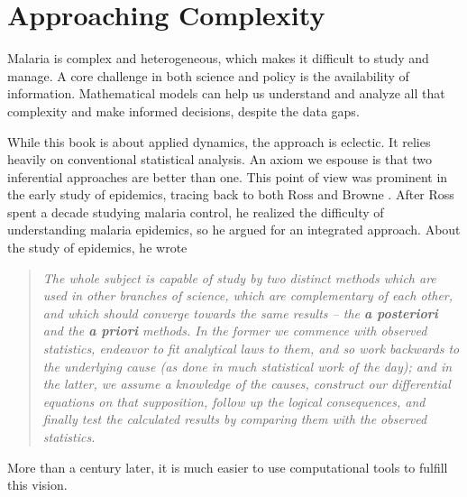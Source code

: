 \documentclass[
]{book}
\begin{document}
\section{Approaching Complexity}\label{approaching-complexity}

Malaria is complex and heterogeneous, which makes it difficult to study and manage. A core challenge in both science and policy is the availability of information. Mathematical models can help us understand and analyze all that complexity and make informed decisions, despite the data gaps.

While this book is about applied dynamics, the approach is eclectic. It relies heavily on conventional statistical analysis. An axiom we espouse is that two inferential approaches are better than one. This point of view was prominent in the early study of epidemics, tracing back to both Ross and Browne \autocite{FinePEM1975RossPriori}. After Ross spent a decade studying malaria control, he realized the difficulty of understanding malaria epidemics, so he argued for an integrated approach. About the study of epidemics, he wrote

\begin{quote}
\emph{The whole subject is capable of study by two distinct methods which are used in other branches of science, which are complementary of each other, and which should converge towards the same results -- the \textbf{a posteriori} and the \textbf{a priori} methods. In the former we commence with observed statistics, endeavor to fit analytical laws to them, and so work backwards to the underlying cause (as done in much statistical work of the day); and in the latter, we assume a knowledge of the causes, construct our differential equations on that supposition, follow up the logical consequences, and finally test the calculated results by comparing them with the observed statistics.}
\end{quote}

More than a century later, it is much easier to use computational tools to fulfill this vision.
\end{document}
